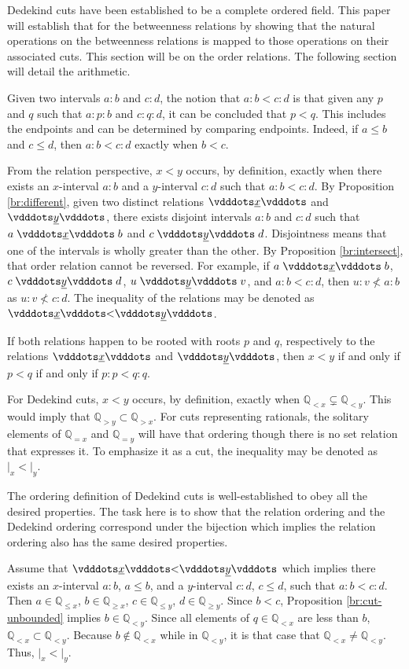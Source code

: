 \documentclass{rmj-public}
\newcommand{\qcut}[2][x]{\ensuremath{\mathbb{Q}_{#2 #1}}}
\newcommand{\qlt}[1][x]{\qcut[#1]{<}}
\newcommand{\qeq}[1][x]{\qcut[#1]{=}}
\newcommand{\qgt}[1][x]{\qcut[#1]{>}}
\newcommand{\qgeq}[1][x]{\qcut[#1]{\geq}}
\newcommand{\qleq}[1][x]{\qcut[#1]{\leq}}
\newcommand{\cut}[1][x]{{\vert}_{#1} }
\newcommand{\yrel}{\xrel[y]}
\begin{document}
Dedekind cuts have been established to be a complete ordered field. This paper will establish that for the betweenness relations by showing that the natural operations on the betweenness relations is mapped to those operations on their associated cuts. This section will be on the order relations. The following section will detail the arithmetic. 

Given two intervals $a:b$ and $c:d$, the notion that $a:b < c:d$ is that given any $p$ and $q$ such that $a:p:b$ and $c:q:d$, it can be concluded that $p < q$. This includes the endpoints and can be determined by comparing endpoints. Indeed, if $a\leq b$ and $c \leq d$, then $a:b < c:d$ exactly when $b < c$. 

From the relation perspective, $x < y$ occurs, by definition, exactly when there exists an $x$-interval $a:b$ and a $y$-interval $c:d$ such that $a:b < c:d$. By Proposition \ref{br:different}, given two distinct relations $\xrel$ and $\yrel$, there exists disjoint intervals $a:b$ and $c:d$ such that $a \xrel b$ and $c \yrel d$. Disjointness means that one of the intervals is wholly greater than the other. By Proposition \ref{br:intersect}, that order relation cannot be reversed. For example, if $a \xrel b$, $c \xrel[y] d$, $u \yrel v$, and $a:b < c:d$, then $u:v \nless a:b$ as $u:v \nless c:d$.  The inequality of the relations may be denoted as $\xrel < \yrel$. 

If both relations happen to be  rooted with roots $p$ and $q$, respectively to the relations $\xrel$ and $\yrel$, then $x<y$ if and only if $p < q$ if and only if $p:p < q:q$. 

For Dedekind cuts, $x < y$ occurs, by definition, exactly when $\qlt \subsetneq \qlt[y]$. This would imply that $\qgt[y] \subset \qgt$. For cuts representing rationals, the solitary elements of $\qeq$ and $\qeq[y]$ will have that ordering though there is no set relation that expresses it. To emphasize it as a cut, the inequality may be denoted as $\cut < \cut[y]$.

The ordering definition of Dedekind cuts is well-established to obey all the desired properties. The task here is to show that the relation ordering and the Dedekind ordering correspond under the bijection which implies the relation ordering also has the same desired properties. 

Assume that $\xrel < \yrel$ which implies there exists an $x$-interval $a:b$, $a \leq b$,  and a $y$-interval $c:d$, $c \leq d$, such that $a:b < c:d$. Then $a \in \qleq$, $b \in \qgeq$, $c \in \qleq[y]$, $d \in \qgeq[y]$. Since $ b< c$, Proposition \ref{br:cut-unbounded} implies $b \in \qlt[y]$. Since all elements of $q \in \qlt$ are less than $b$, $\qlt \subset \qlt[y]$. Because $b\notin \qlt$ while in $\qlt[y]$, it is that case that $\qlt \neq \qlt[y]$. Thus,  $\cut < \cut[y]$. 
\end{document}
